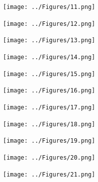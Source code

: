 \documentclass{beamer}
\theoremstyle{remark}
\theoremstyle{plain}
\begin{document}
\begin{frame}
\begin{figure}[!t]
		\begin{subfigure}[t]{0.13\textwidth}
			\texttt{[image: ../Figures/11.png]}
			\caption{}
			\label{fig:apple}
		\end{subfigure}
		\begin{subfigure}[t]{0.13\textwidth}
			\texttt{[image: ../Figures/12.png]}
			\caption{}
			\label{fig:lemon}
		\end{subfigure}
		\begin{subfigure}[t]{0.13\textwidth}
			\texttt{[image: ../Figures/13.png]}
			\caption{}
			\label{fig:peach}
		\end{subfigure}
		\begin{subfigure}[t]{0.13\textwidth}
			\texttt{[image: ../Figures/14.png]}
			\caption{}
			\label{fig:pear}
		\end{subfigure}
		\begin{subfigure}[t]{0.13\textwidth}
			\texttt{[image: ../Figures/15.png]}
			\caption{}
			\label{fig:orange}
		\end{subfigure}
		\begin{subfigure}[t]{0.13\textwidth}
			\texttt{[image: ../Figures/16.png]}
			\caption{}
			\label{fig:plum}
		\end{subfigure}
		\begin{subfigure}[t]{0.13\textwidth}
			\texttt{[image: ../Figures/17.png]}
			\caption{}
			\label{fig:bleachcleaner}
		\end{subfigure}
		\begin{subfigure}[t]{0.13\textwidth}
			\texttt{[image: ../Figures/18.png]}
			\caption{}
			\label{fig:fork}
		\end{subfigure}
		\begin{subfigure}[t]{0.13\textwidth}
			\texttt{[image: ../Figures/19.png]}
			\caption{}
			\label{fig:spoon}
		\end{subfigure}
		\begin{subfigure}[t]{0.13\textwidth}
			\texttt{[image: ../Figures/20.png]}
			\caption{}
			\label{fig:knife}
		\end{subfigure}
		\begin{subfigure}[t]{0.13\textwidth}
			\texttt{[image: ../Figures/21.png]}
			\caption{}
			\label{fig:spatula}
		\end{subfigure}
	\end{figure}
	
\end{frame}
\end{document}
